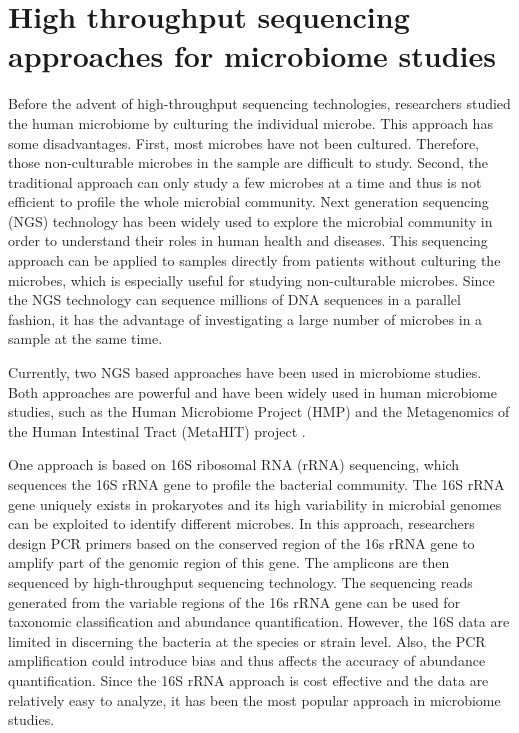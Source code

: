 \section{High throughput sequencing approaches for microbiome studies}
Before the advent of high-throughput sequencing technologies, researchers studied the human microbiome by culturing the individual microbe. This approach has some disadvantages. First, most microbes have not been cultured. Therefore, those non-culturable microbes in the sample are difficult to study. Second, the traditional approach can only study a few microbes at a time and thus is not efficient to profile the whole microbial community. Next generation sequencing (NGS) technology has been widely used to explore the microbial community in order to understand their roles in human health and diseases. This sequencing approach can be applied to samples directly from patients without culturing the microbes, which  is especially useful for studying non-culturable microbes. Since the NGS technology can sequence millions of DNA sequences in a parallel fashion, it has the advantage of  investigating  a large number of microbes in a sample at the same time.


Currently, two NGS based approaches have been  used in microbiome studies. Both approaches are powerful and have been widely used in human microbiome studies, such as the Human Microbiome Project (HMP) \citep{turnbaugh2007human} and the Metagenomics of the Human Intestinal Tract (MetaHIT) project \citep{qin2010human}. 

One approach is based on 16S ribosomal RNA (rRNA) sequencing, which sequences the 16S rRNA gene to profile the bacterial community. The 16S rRNA gene uniquely exists in prokaryotes and its high variability in microbial genomes can be exploited to identify different microbes. In this approach, researchers  design PCR primers based on the conserved region of the 16s rRNA gene to amplify part of the genomic region of this gene. The amplicons are then sequenced by high-throughput sequencing technology. The sequencing reads generated from the variable regions of the 16s rRNA gene can be used for taxonomic classification and abundance quantification. However, the 16S data are limited in discerning the bacteria at the species or strain level. Also, the PCR amplification could  introduce bias and thus affects the accuracy of abundance quantification. Since the 16S rRNA approach is cost effective and the data are relatively easy to analyze, it has been the most popular approach in microbiome studies. 

